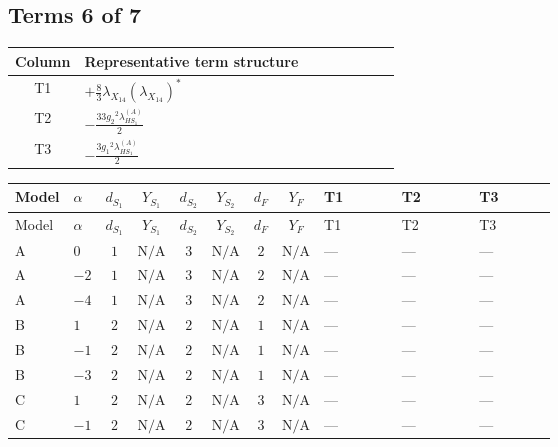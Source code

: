 \documentclass[8pt]{article}
\begin{document}
\begin{landscape}
\subsection*{Terms 6 of 7}
\begin{center}
\begin{tabular}{@{}c >{\raggedright\arraybackslash}p{0.82\linewidth}@{}}
\toprule
Column & Representative term structure \\
\midrule
T1 & \(\displaystyle +\frac{8}{3} {\lambda_{X_{14}}} \left({\lambda_{X_{14}}}\right)^{*}\) \\
\midrule
T2 & \(\displaystyle -\frac{33 {g_2}^2 {\lambda_{HS_1}^{(A)}}}{2}\) \\
\midrule
T3 & \(\displaystyle -\frac{3 {g_1}^2 {\lambda_{HS_1}^{(A)}}}{2}\) \\
\midrule
\bottomrule
\end{tabular}
\end{center}
\smallskip
\tiny
\begin{longtable}{@{}llcccccc >{\raggedright\arraybackslash}p{0.21\linewidth} >{\raggedright\arraybackslash}p{0.21\linewidth} >{\raggedright\arraybackslash}p{0.21\linewidth}@{}}
\toprule
Model & $\alpha$ & $d_{S_1}$ & $Y_{S_1}$ & $d_{S_2}$ & $Y_{S_2}$ & $d_F$ & $Y_F$ & T1 & T2 & T3 \\
\midrule
\endfirsthead
\toprule
Model & $\alpha$ & $d_{S_1}$ & $Y_{S_1}$ & $d_{S_2}$ & $Y_{S_2}$ & $d_F$ & $Y_F$ & T1 & T2 & T3 \\
\midrule
\endhead
A & $0$ & $1$ & $\text{N/A}$ & $3$ & $\text{N/A}$ & $2$ & $\text{N/A}$ & --- & --- & --- \\
\midrule
A & $-2$ & $1$ & $\text{N/A}$ & $3$ & $\text{N/A}$ & $2$ & $\text{N/A}$ & --- & --- & --- \\
\midrule
A & $-4$ & $1$ & $\text{N/A}$ & $3$ & $\text{N/A}$ & $2$ & $\text{N/A}$ & --- & --- & --- \\
\midrule
B & $1$ & $2$ & $\text{N/A}$ & $2$ & $\text{N/A}$ & $1$ & $\text{N/A}$ & --- & --- & --- \\
\midrule
B & $-1$ & $2$ & $\text{N/A}$ & $2$ & $\text{N/A}$ & $1$ & $\text{N/A}$ & --- & --- & --- \\
\midrule
B & $-3$ & $2$ & $\text{N/A}$ & $2$ & $\text{N/A}$ & $1$ & $\text{N/A}$ & --- & --- & --- \\
\midrule
C & $1$ & $2$ & $\text{N/A}$ & $2$ & $\text{N/A}$ & $3$ & $\text{N/A}$ & --- & --- & --- \\
\midrule
C & $-1$ & $2$ & $\text{N/A}$ & $2$ & $\text{N/A}$ & $3$ & $\text{N/A}$ & --- & --- & --- \\

\end{longtable}
\end{landscape}
\end{document}
